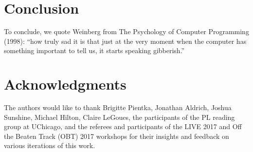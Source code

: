 \newcommand{\discussionSection}{Conclusion}
\section{\protect\discussionSection} %
\label{sec:discussion}
To conclude, we quote Weinberg from The Psychology of Computer Programming (1998): ``how truly sad it is that just at the very moment
when the computer has something important to tell us, it starts
speaking gibberish.''

\newcommand{\acksSection}{Acknowledgments}
\section*{\protect\acksSection} 
\label{sec:acks}

The authors would like to thank Brigitte Pientka, Jonathan Aldrich, Joshua Sunshine, Michael Hilton, Claire LeGoues, the participants of the PL reading group at UChicago, and the referees and participants of the LIVE 2017 and Off the Beaten Track (OBT) 2017 workshops for their insights and feedback on various iterations of this work. 









